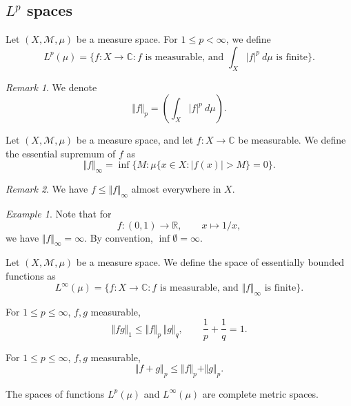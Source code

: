 \documentclass[11pt]{article}
\newcommand{\C}{\mathbb{C}}
\newcommand{\R}{\mathbb{R}}
\newcommand{\M}{\mathcal{M}}
\newcommand{\norm}[1]{\Vert #1 \Vert}
\theoremstyle{definition}
\theoremstyle{remark}
\newtheorem*{remark}{Remark}
\newtheorem*{example}{Example}
\numberwithin{equation}{section}
\begin{document}
    \subsection{$L^p$ spaces}
    \begin{definition}
        Let $(X, \M, \mu)$ be a measure space. For $1 \leq p < \infty$, we define \[
            L^p(\mu) = \{f\colon X \to \C : f\text{ is measurable, and }\int_X
            |f|^p\:d\mu \text{ is finite}\}.
        \]
        \begin{remark}
            We denote \[
                \norm{f}_p = \left(\int_X |f|^p\:d\mu\right).
            \] 
        \end{remark}
    \end{definition}

    \begin{definition}
        Let $(X, \M, \mu)$ be a measure space, and let $f\colon X \to \C$ be
        measurable. We define the essential supremum of $f$ as \[
            \norm{f}_\infty = \inf \{M : \mu\{x \in X: |f(x)| > M\} = 0\}.
        \]
        \begin{remark}
            We have $f \leq \norm{f}_\infty$ almost everywhere in $X$.
        \end{remark}
    \end{definition}
    \begin{example}
        Note that for \[
            f\colon (0, 1) \to \R, \qquad x \mapsto 1 / x,
        \] we have $\norm{f}_\infty = \infty$. By convention, $\inf\emptyset =
        \infty$.
    \end{example}

    \begin{definition}
        Let $(X, \M, \mu)$ be a measure space. We define the space of essentially
        bounded functions as \[
            L^\infty(\mu) = \{f\colon X \to \C : f\text{ is measurable, and }
            \norm{f}_\infty \text{ is finite}\}.
        \]
    \end{definition}

    \begin{lemma}[H\"older]
        For $1 \leq p \leq \infty$, $f, g$ measurable, \[
            \norm{fg}_1 \leq \norm{f}_p\, \norm{g}_q, \qquad \frac{1}{p}
            + \frac{1}{q} = 1.
        \] 
    \end{lemma}
    
    \begin{lemma}[Minkowski]
        For $1 \leq p \leq \infty$, $f, g$ measurable, \[
            \norm{f + g}_p \leq \norm{f}_p + \norm{g}_p.
        \] 
    \end{lemma}

    \begin{theorem}
        The spaces of functions $L^p(\mu)$ and $L^\infty(\mu)$ are complete metric
        spaces.
    \end{theorem}
\end{document}
